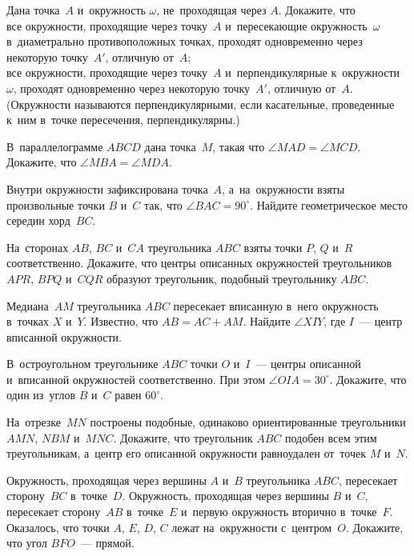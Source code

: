 


\begin{problems}

\item
Дана точка~$A$ и~окружность $\omega$, не~проходящая через $A$.
Докажите, что
\\
\subproblem
все окружности, проходящие через точку~$A$ и~пересекающие окружность~$\omega$
в~диаметрально противоположных точках, проходят одновременно через некоторую
точку~$A'$, отличную от~$A$;
\\
\subproblem
все окружности, проходящие через точку~$A$ и~перпендикулярные
к~окружности~$\omega$, проходят одновременно через некоторую точку~$A'$,
отличную от~$A$.
(Окружности называются перпендикулярными, если касательные, проведенные к~ним
в~точке пересечения, перпендикулярны.)

\item
В~параллелограмме $ABCD$ дана точка~$M$, такая что $\angle MAD = \angle MCD$.
Докажите, что $\angle MBA = \angle MDA$.

\item
Внутри окружности зафиксирована точка~$A$, а~на~окружности взяты произвольные
точки $B$ и~$C$ так, что $\angle BAC = 90^{\circ}$.
Найдите геометрическое место середин хорд~$BC$.

\item
На~сторонах $AB$, $BC$ и~$CA$ треугольника $ABC$ взяты точки $P$, $Q$ и~$R$
соответственно.
Докажите, что центры описанных окружностей треугольников $APR$, $BPQ$ и~$CQR$
образуют треугольник, подобный треугольнику $ABC$.

\item
Медиана~$AM$ треугольника $ABC$ пересекает вписанную в~него окружность
в~точках $X$ и~$Y$.
Известно, что $AB = AC + AM$.
Найдите $\angle XIY$, где $I$~--- центр вписанной окружности.

\item
В~остроугольном треугольнике $ABC$ точки $O$ и~$I$~--- центры описанной
и~вписанной окружностей соответственно.
При этом $\angle OIA = 30^\circ$.
Докажите, что один из~углов $B$ и~$C$ равен $60^\circ$.

\item
На~отрезке~$MN$ построены подобные, одинаково ориентированные треугольники
$AMN$, $NBM$ и~$MNC$.
Докажите, что треугольник $ABC$ подобен всем этим треугольникам, а~центр его
описанной окружности равноудален от~точек $M$ и~$N$.

\item
Окружность, проходящая через вершины $A$ и~$B$ треугольника $ABC$, пересекает
сторону~$BC$ в~точке~$D$.
Окружность, проходящая через вершины $B$ и~$C$, пересекает сторону~$AB$
в~точке~$E$ и~первую окружность вторично в~точке~$F$.
Оказалось, что точки $A$, $E$, $D$, $C$ лежат на~окружности с~центром~$O$.
Докажите, что угол $BFO$~--- прямой.

\end{problems}


